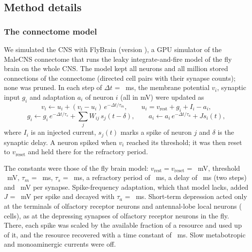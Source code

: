\subsection{Method details}

\subsubsection{The connectome model}

We simulated the CNS with FlyBrain (version ), a GPU simulator of the MaleCNS connectome that runs the leaky
integrate-and-fire model of the fly brain on the whole CNS. The model kept all  neurons and all
 million stored connections of the connectome (directed cell pairs with their synapse counts); none was pruned. In
each step of $\Delta t$ = ~ms, the membrane potential $v_i$, synaptic input $g_i$ and adaptation $a_i$ of neuron $i$
(all in mV) were updated as
\begin{equation*}
v_i \leftarrow u_i + (v_i - u_i)\,e^{-\Delta t/\tau_m}, \qquad u_i = v_{\mathrm{rest}} + g_i + I_i - a_i,
\end{equation*}
\begin{equation*}
g_i \leftarrow g_i\,e^{-\Delta t/\tau_s} + \textstyle\sum_j W_{ij}\, s_j(t - \delta), \qquad a_i \leftarrow a_i\,e^{-\Delta
t/\tau_a} + J s_i(t),
\end{equation*}
where $I_i$ is an injected current, $s_j(t)$ marks a spike of neuron $j$ and $\delta$ is the synaptic delay. A neuron spiked
when $v_i$ reached its threshold; it was then reset to $v_{\mathrm{reset}}$ and held there for the refractory period.

The constants were those of the fly brain model: $v_{\mathrm{rest}} = v_{\mathrm{reset}}$ = ~mV,
threshold ~mV, $\tau_m$ = ~ms, $\tau_s$ = ~ms, a refractory period of ~ms, a delay of
~ms (two steps) and ~mV per synapse. Spike-frequency adaptation, which that model lacks, added
$J$ = ~mV per spike and decayed with $\tau_a$ = ~ms. Short-term depression acted only at the terminals of
olfactory receptor neurons and antennal-lobe local neurons ( cells), as at the depressing synapses of olfactory
receptor neurons in the fly. There, each spike was scaled by the available fraction of a resource and used up  of it, and the
resource recovered with a time constant of ~ms. Slow metabotropic and monoaminergic currents were off.

